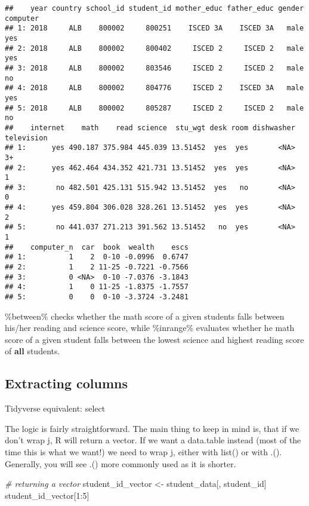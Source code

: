 \documentclass[
]{article}
\newenvironment{Shaded}{\begin{snugshade}}{\end{snugshade}}
\newcommand{\CommentTok}[1]{\textcolor[rgb]{0.56,0.35,0.01}{\textit{#1}}}
\newcommand{\DecValTok}[1]{\textcolor[rgb]{0.00,0.00,0.81}{#1}}
\newcommand{\NormalTok}[1]{#1}
\newcommand{\OtherTok}[1]{\textcolor[rgb]{0.56,0.35,0.01}{#1}}
\newcommand{\SpecialCharTok}[1]{\textcolor[rgb]{0.00,0.00,0.00}{#1}}
\begin{document}
\begin{verbatim}
##    year country school_id student_id mother_educ father_educ gender computer
## 1: 2018     ALB    800002     800251    ISCED 3A    ISCED 3A   male      yes
## 2: 2018     ALB    800002     800402     ISCED 2     ISCED 2   male      yes
## 3: 2018     ALB    800002     803546     ISCED 2     ISCED 2   male       no
## 4: 2018     ALB    800002     804776     ISCED 2    ISCED 3A   male      yes
## 5: 2018     ALB    800002     805287     ISCED 2     ISCED 2   male       no
##    internet    math    read science  stu_wgt desk room dishwasher television
## 1:      yes 490.187 375.984 445.039 13.51452  yes  yes       <NA>         3+
## 2:      yes 462.464 434.352 421.731 13.51452  yes  yes       <NA>          1
## 3:       no 482.501 425.131 515.942 13.51452  yes   no       <NA>          0
## 4:      yes 459.804 306.028 328.261 13.51452  yes  yes       <NA>          2
## 5:       no 441.037 271.213 391.562 13.51452   no  yes       <NA>          1
##    computer_n  car  book  wealth    escs
## 1:          1    2  0-10 -0.0996  0.6747
## 2:          1    2 11-25 -0.7221 -0.7566
## 3:          0 <NA>  0-10 -7.0376 -3.1843
## 4:          1    0 11-25 -1.8375 -1.7557
## 5:          0    0  0-10 -3.3724 -3.2481
\end{verbatim}

\%between\% checks whether the math score of a given students falls
between his/her reading and science score, while \%inrange\% evaluates
whether he math score of a given student falls between the lowest
science and highest reading score of \textbf{all} students.

\hypertarget{extracting-columns}{%
\subsection{Extracting columns}\label{extracting-columns}}

{Tidyverse equivalent: select}

The logic is fairly straightforward. The main thing to keep in mind is,
that if we don't wrap j, R will return a vector. If we want a data.table
instead (most of the time this is what we want!) we need to wrap j,
either with list() or with .(). Generally, you will see .() more
commonly used as it is shorter.

\begin{Shaded}
\begin{Highlighting}[]
\CommentTok{\# returning a vector}
\NormalTok{student\_id\_vector }\OtherTok{\textless{}{-}}\NormalTok{ student\_data[, student\_id] }
\NormalTok{student\_id\_vector[}\DecValTok{1}\SpecialCharTok{:}\DecValTok{5}\NormalTok{]}
\end{Highlighting}
\end{Shaded}
\end{document}
